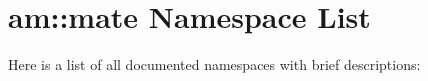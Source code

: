 \section{am::mate Namespace List}
Here is a list of all documented namespaces with brief descriptions:\begin{CompactList}
\item{}
\item{}
\end{CompactList}
